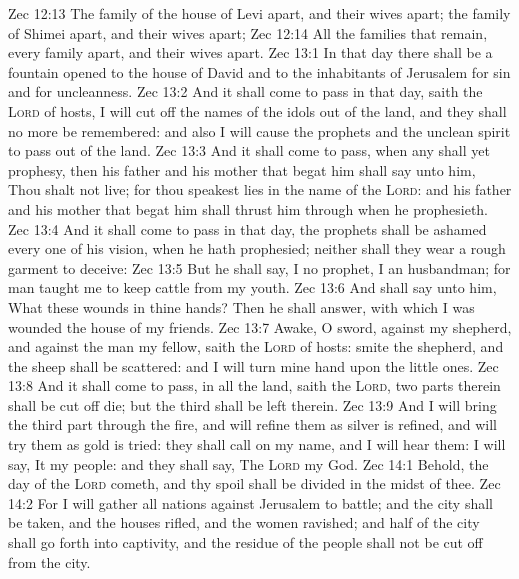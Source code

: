 \vs Zec 12:13 The family of the house of Levi apart, and their wives apart; the family of Shimei apart, and their wives apart;
\vs Zec 12:14 All the families that remain, every family apart, and their wives apart.
\vs Zec 13:1 In that day there shall be a fountain opened to the house of David and to the inhabitants of Jerusalem for sin and for uncleanness.
\vs Zec 13:2 And it shall come to pass in that day, saith the \textsc{Lord} of hosts,  I will cut off the names of the idols out of the land, and they shall no more be remembered: and also I will cause the prophets and the unclean spirit to pass out of the land.
\vs Zec 13:3 And it shall come to pass,  when any shall yet prophesy, then his father and his mother that begat him shall say unto him, Thou shalt not live; for thou speakest lies in the name of the \textsc{Lord}: and his father and his mother that begat him shall thrust him through when he prophesieth.
\vs Zec 13:4 And it shall come to pass in that day,  the prophets shall be ashamed every one of his vision, when he hath prophesied; neither shall they wear a rough garment to deceive:
\vs Zec 13:5 But he shall say, I  no prophet, I  an husbandman; for man taught me to keep cattle from my youth.
\vs Zec 13:6 And  shall say unto him, What  these wounds in thine hands? Then he shall answer,  with which I was wounded  the house of my friends.
\vs Zec 13:7 Awake, O sword, against my shepherd, and against the man  my fellow, saith the \textsc{Lord} of hosts: smite the shepherd, and the sheep shall be scattered: and I will turn mine hand upon the little ones.
\vs Zec 13:8 And it shall come to pass,  in all the land, saith the \textsc{Lord}, two parts therein shall be cut off  die; but the third shall be left therein.
\vs Zec 13:9 And I will bring the third part through the fire, and will refine them as silver is refined, and will try them as gold is tried: they shall call on my name, and I will hear them: I will say, It  my people: and they shall say, The \textsc{Lord}  my God.
\vs Zec 14:1 Behold, the day of the \textsc{Lord} cometh, and thy spoil shall be divided in the midst of thee.
\vs Zec 14:2 For I will gather all nations against Jerusalem to battle; and the city shall be taken, and the houses rifled, and the women ravished; and half of the city shall go forth into captivity, and the residue of the people shall not be cut off from the city.
